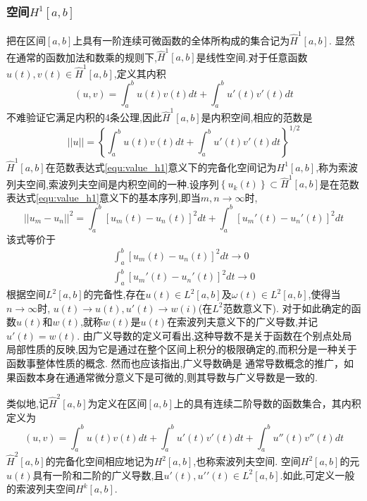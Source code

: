 \documentclass{suesreport}
\begin{document}
    \subsubsection{空间$H^{1}\left[a,b\right]$}
    把在区间$[a,b]$上具有一阶连续可微函数的全体所构成的集合记为$\widehat{H}^{1}[a,b]$.
    显然 在通常的函数加法和数乘的规则下,$\widehat{H}^{1}[a,b]$是线性空间.对于任意函数$u(t),v(t)\in\widehat{H}^{1}[a,b]$,定义其内积
    \begin{equation}
        \left(u,v\right)=\int_{a}^{b}u(t)v(t)dt+\int_{a}^{b}u'(t)v'(t)dt
    \end{equation}
    不难验证它满足内积的4条公理,因此$\widehat{H}^{1}[a,b]$是内积空间,相应的范数是
    \begin{equation}
        \left|\right|u\left|\right|=\left\{\int_{a}^{b}u(t)v(t)dt+\int_{a}^{b}u'(t)v'(t)dt\right\}^{1/2}\label{equ:value_h1}
    \end{equation}
    $\widehat{H}^{1}[a,b]$在范数表达式\ref{equ:value_h1}意义下的完备化空间记为$H^{1}\left[a,b\right]$,称为索波列夫空间,索波列夫空间是内积空间的一种.设序列$\left\{u_{k}(t)\right\}\subset\widehat{H}^{1}[a,b]$是在范数表达式\ref{equ:value_h1}意义下的基本序列,即当$m,n\rightarrow\infty$时,
    \begin{equation}
        \left|\right|u_{m}-u_{n}\left|\right|^{2}= \int_{a}^{b}\left[u_{m}(t)-u_{n}(t)\right]^{2}dt+\int_{a}^{b}\left[u_{m}'(t)-u_{n}'(t)\right]^{2}dt
    \end{equation}
    该式等价于
    \begin{eqnarray}
        \int_{a}^{b}\left[u_{m}(t)-u_{n}(t)\right]^{2}dt\rightarrow0\nonumber\\
        \int_{a}^{b}\left[u_{m}'(t)-u_{n}'(t)\right]^{2}dt\rightarrow0\nonumber
    \end{eqnarray}
    根据空间$L^{2}[a,b]$的完备性,存在$u(t)\in{L^{2}[a,b]}$及$\omega(t)\in{L^{2}[a,b]}$,使得当$n\rightarrow\infty$时,
    $u(t)\rightarrow{u(t)},u\prime{(t)}\rightarrow{w(i)}$(在$L^{2}$范数意义下).
    对于如此确定的函数$u(t)$和$w(t)$,就称$w(t)$是$u(t)$在索波列夫意义下的广义导数,并记$u\prime{(t)}=w(t)$.
    由广义导数的定义可看出,这种导数不是关于函数在个别点处局局部性质的反映,因为它是通过在整个区间上积分的极限确定的,而积分是一种关于函数事整体性质的概念.
    然而也应该指出,广义导数确是 通常导数概念的推广，如果函数本身在通通常微分意义下是可微的,则其导数与广义导数是一致的.

    类似地,记$\widehat{H}^{2}[a,b]$为定义在区间$[a,b]$上的具有连续二阶导数的函数集合，其内积定义为
    \begin{equation}
        \left(u,v\right)=\int_{a}^{b}u(t)v(t)dt+\int_{a}^{b}u'(t)v'(t)dt+\int_{a}^{b}u''(t)v''(t)dt
    \end{equation}
    $\widehat{H}^{2}[a,b]$的完备化空间相应地记为$H^{2}[a,b]$,也称索波列夫空间.
    空间$H^{2}[a,b]$的元$u(t)$具有一阶和二阶的广义导数,且$u\prime{(t)},u\prime\prime{(t)}\in{L^{2}[a,b]}$.如此,可定义一般的索波列夫空间$H^{k}[a,b]$.
\end{document}
